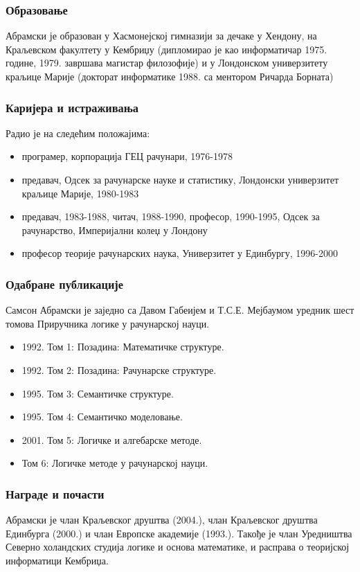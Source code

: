 \documentclass{beamer}
\begin{document}
\begin{frame}
\frametitle{Образовање}
Абрамски је образован у Хасмонејској гимназији за дечаке у Хендону, на Краљевском факултету у Кембриџу (дипломирао је као информатичар 1975. године, 1979. завршава магистар филозофије) и у Лондонском универзитету краљице Марије (докторат информатике 1988. са ментором Ричарда Борната)
\end{frame}

\begin{frame}
\frametitle{Каријера и истраживања}

Радио је на следећим положајима:

\begin{itemize}
\item     програмер, корпорација ГЕЦ рачунари, 1976-1978
\item     предавач, Одсек за рачунарске науке и статистику, Лондонски универзитет краљице Марије, 1980-1983
\item     предавач, 1983-1988, читач, 1988-1990, професор, 1990-1995, Одсек за рачунарство, Империјални колеџ у Лондону
\item     професор теорије рачунарских наука, Универзитет у Единбургу, 1996-2000
\end{itemize}
\end{frame}

\begin{frame}
\frametitle{Одабране публикације}
Самсон Абрамски је заједно са Давом Габеијем и Т.С.Е. Мејбаумом уредник шест томова Приручника логике у рачунарској науци. 
\begin{itemize}
\item     1992. Том 1: Позадина: Математичке структуре.
\item     1992. Том 2: Позадина: Рачунарске структуре.
\item     1995. Том 3: Семантичке структуре.
\item     1995. Том 4: Семантичко моделовање.
\item     2001. Том 5: Логичке и алгебарске методе.
\item 	  Том 6: Логичке методе у рачунарској науци.
\end{itemize}
\end{frame}

\begin{frame}
\frametitle{Награде и почасти}
Абрамски је члан Краљевског друштва (2004.), члан Краљевског друштва Единбурга (2000.) и члан Европске академије (1993.). Такође је члан Уредништва Северно холандских студија логике и основа математике, и расправа о теоријској информатици Кембриџа. 
\end{frame}
\end{document}
